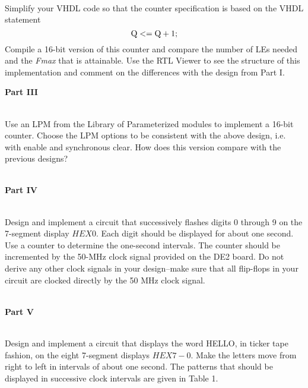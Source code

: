 \documentclass[psfig,10pt,fullpage]{article}
\begin{document}
~\\
\noindent
Simplify your VHDL code so that the counter specification is based on
the VHDL statement
$$
{\rm Q <= Q + 1;}
$$
\noindent
Compile a 16-bit version of this counter and compare the number of LEs needed
and the {\it Fmax} that is attainable.
Use the RTL Viewer to see the structure of this implementation and comment on
the differences with the design from Part I.

\pagebreak
\noindent
{\bf Part III}

~\\
\noindent
Use an LPM from the Library of Parameterized modules to implement a 16-bit 
counter. Choose the LPM options to be consistent with the above design, i.e.
with enable and synchronous clear.
How does this version compare with the previous designs?

~\\
\noindent
{\bf Part IV}

~\\
\noindent
Design and implement a circuit that successively flashes digits 0 
through 9 on the 7-segment display $HEX0$. Each digit should be 
displayed for about one second. Use a counter to determine the one-second 
intervals. The counter should be incremented by the 50-MHz clock signal 
provided on the DE2 board. Do not derive any other clock signals in your design--make 
sure that all flip-flops in your circuit are clocked directly by the 50 MHz clock signal.

~\\
\noindent
{\bf Part V}

~\\
\noindent
Design and implement a circuit that displays the word HELLO, in
ticker tape fashion, on the eight 7-segment displays $HEX7-0$. 
Make the letters move from right to left in intervals of about one second.
The patterns that should be displayed in successive clock intervals are given in Table 1.
\end{document}
